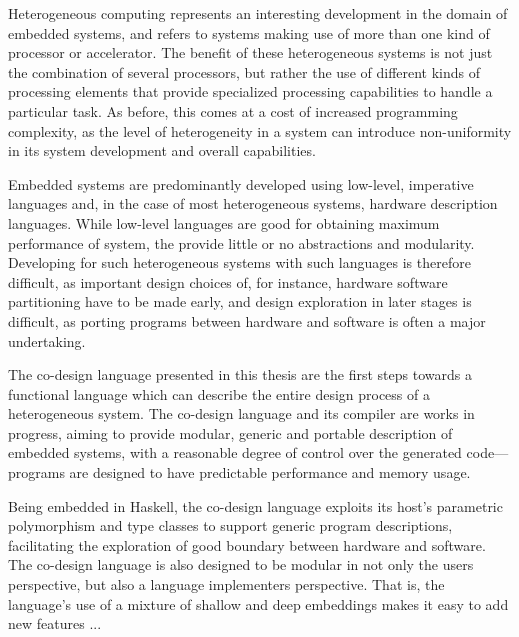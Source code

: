 \documentclass[../paper.tex]{subfiles}
\begin{document}
Heterogeneous computing represents an interesting development in the domain of embedded systems, and refers to systems making use of more than one kind of processor or accelerator. The benefit of these heterogeneous systems is not just the combination of several processors, but rather the use of different kinds of processing elements that provide specialized processing capabilities to handle a particular task. As before, this comes at a cost of increased programming complexity, as the level of heterogeneity in a system can introduce non-uniformity in its system development and overall capabilities.

Embedded systems are predominantly developed using low-level, imperative languages and, in the case of most heterogeneous systems, hardware description languages. While low-level languages are good for obtaining maximum performance of system, the provide little or no abstractions and modularity. Developing for such heterogeneous systems with such languages is therefore difficult, as important design choices of, for instance, hardware software partitioning have to be made early, and design exploration in later stages is difficult, as porting programs between hardware and software is often a major undertaking.

The co-design language presented in this thesis are the first steps towards a functional language which can describe the entire design process of a heterogeneous system. The co-design language and its compiler are works in progress, aiming to provide modular, generic and portable description of embedded systems, with a reasonable degree of control over the generated code---programs are designed to have predictable performance and memory usage.

Being embedded in Haskell, the co-design language exploits its host's parametric polymorphism and type classes to support generic program descriptions, facilitating the exploration of good boundary between hardware and software. The co-design language is also designed to be modular in not only the users perspective, but also a language implementers perspective. That is, the language's use of a mixture of shallow and deep embeddings makes it easy to add new features ...

\end{document}

